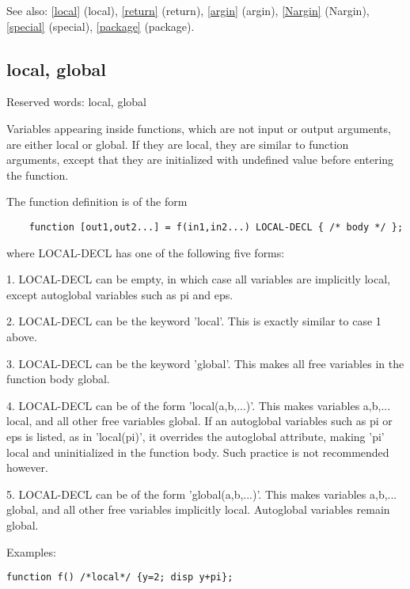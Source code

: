 \documentclass[a4paper]{article}
\begin{document}
See also: \ref{local} {(local)}, \ref{return} {(return)},
\ref{argin} {(argin)}, \ref{Nargin} {(Nargin)},
\ref{special} {(special)}, \ref{package} {(package)}.




\subsection{local, global\label{local}}

Reserved words: local, global

Variables appearing inside functions, which are not input or output
arguments, are either local or global. If they are local, they are
similar to function arguments, except that they are initialized with
undefined value before entering the function.

The function definition is of the form
\begin{tscreen}
\begin{verbatim}
    function [out1,out2...] = f(in1,in2...) LOCAL-DECL { /* body */ };
\end{verbatim}
\end{tscreen}

where LOCAL-DECL has one of the following five forms:

1. LOCAL-DECL can be empty, in which case all variables are implicitly
local, except autoglobal variables such as pi and eps.

2. LOCAL-DECL can be the keyword 'local'. This is exactly similar to
case 1 above.

3. LOCAL-DECL can be the keyword 'global'. This makes all free variables
in the function body global.

4. LOCAL-DECL can be of the form 'local(a,b,...)'. This makes variables
a,b,... local, and all other free variables global. If an autoglobal
variables such as pi or eps is listed, as in 'local(pi)', it overrides
the autoglobal attribute, making 'pi' local and uninitialized in the
function body. Such practice is not recommended however.

5. LOCAL-DECL can be of the form 'global(a,b,...)'. This makes variables
a,b,... global, and all other free variables implicitly local. Autoglobal
variables remain global.

Examples:

\begin{tscreen}
\begin{verbatim}
function f() /*local*/ {y=2; disp y+pi};
\end{verbatim}
\end{tscreen}
\end{document}
